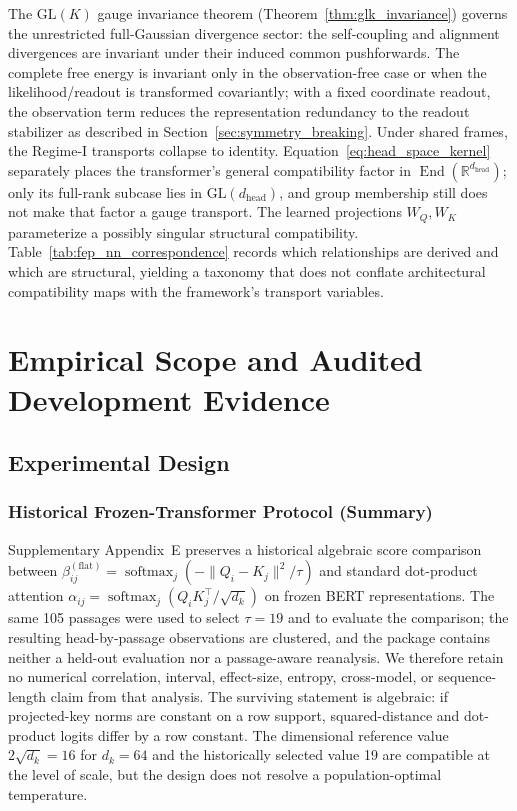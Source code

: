 \documentclass[twoside,11pt]{article}
\newcommand{\softmax}{\operatorname{softmax}}
\begin{document}
The $\mathrm{GL}(K)$ gauge invariance theorem (Theorem~\ref{thm:glk_invariance}) governs the unrestricted full-Gaussian divergence sector: the self-coupling and alignment divergences are invariant under their induced common pushforwards. The complete free energy is invariant only in the observation-free case or when the likelihood/readout is transformed covariantly; with a fixed coordinate readout, the observation term reduces the representation redundancy to the readout stabilizer as described in Section~\ref{sec:symmetry_breaking}. Under shared frames, the Regime-I transports collapse to identity. Equation~\eqref{eq:head_space_kernel} separately places the transformer's general compatibility factor in $\operatorname{End}(\mathbb{R}^{d_{\text{head}}})$; only its full-rank subcase lies in $\mathrm{GL}(d_{\text{head}})$, and group membership still does not make that factor a gauge transport. The learned projections $W_Q, W_K$ parameterize a possibly singular structural compatibility. Table~\ref{tab:fep_nn_correspondence} records which relationships are derived and which are structural, yielding a taxonomy that does not conflate architectural compatibility maps with the framework's transport variables.


\section{Empirical Scope and Audited Development Evidence}

\subsection{Experimental Design}

\subsubsection{Historical Frozen-Transformer Protocol (Summary)}
\label{sec:bert_summary}
Supplementary Appendix~E preserves a historical algebraic score comparison between $\beta_{ij}^{(\mathrm{flat})}=\softmax_j(-\|Q_i-K_j\|^2/\tau)$ and standard dot-product attention $\alpha_{ij}=\softmax_j(Q_iK_j^\top/\sqrt{d_k})$ on frozen BERT representations. The same 105 passages were used to select $\tau=19$ and to evaluate the comparison; the resulting head-by-passage observations are clustered, and the package contains neither a held-out evaluation nor a passage-aware reanalysis. We therefore retain no numerical correlation, interval, effect-size, entropy, cross-model, or sequence-length claim from that analysis. The surviving statement is algebraic: if projected-key norms are constant on a row support, squared-distance and dot-product logits differ by a row constant. The dimensional reference value $2\sqrt{d_k}=16$ for $d_k=64$ and the historically selected value 19 are compatible at the level of scale, but the design does not resolve a population-optimal temperature.
\end{document}
